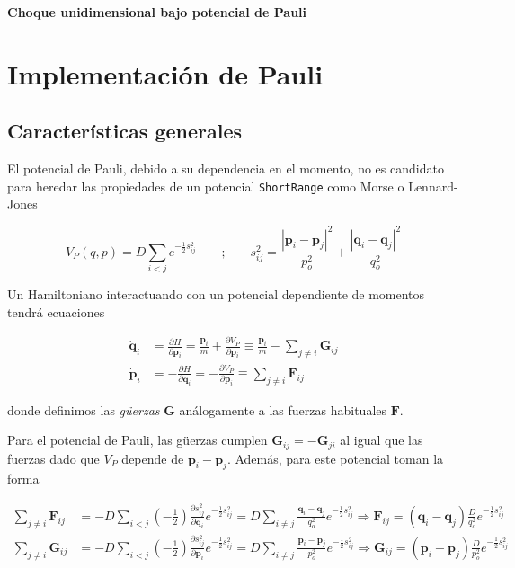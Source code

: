 \documentclass[twoside, 12pt]{article}
\providecommand{\dpart}[2]{\frac{\partial#1}{\partial#2}}
\begin{document}
\begin{center}
	{\fontsize{20pt}{10pt}\textbf{Choque unidimensional bajo potencial de Pauli}}
\end{center}

\section{Implementación de Pauli}

\subsection{Características generales}

El potencial de Pauli, debido a su dependencia en el momento, no es candidato para heredar las propiedades de un potencial \texttt{ShortRange} como Morse o Lennard-Jones

\[ V_{P}(q,p) = D\sum_{i<j} e^{-\frac{1}{2}s_{ij}^2} \qquad \text{;} \qquad s_{ij}^2 = \frac{|\mathbf{p}_i - \mathbf{p}_j|^2}{p_o^2} + \frac{|\mathbf{q}_i - \mathbf{q}_j|^2}{q_o^2}\]

Un Hamiltoniano interactuando con un potencial dependiente de momentos tendrá ecuaciones

\begin{align*}
\dot{\mathbf{q}}_i &= \dpart{H}{\mathbf{p}_i} = \frac{\mathbf{p}_i}{m} + \dpart{V_P}{\mathbf{p}_i} \equiv \frac{\mathbf{p}_i}{m} - \sum_{j\neq i} \mathbf{G}_{ij} \\
\dot{\mathbf{p}}_i &= -\dpart{H}{\mathbf{q}_i} = -\dpart{V_P}{\mathbf{p}_i} \equiv \sum_{j\neq i} \mathbf{F}_{ij}
\end{align*}

donde definimos las \textit{güerzas} $\mathbf{G}$ análogamente a las fuerzas habituales $\mathbf{F}$.

Para el potencial de Pauli, las güerzas cumplen $\mathbf{G}_{ij} = -\mathbf{G}_{ji}$ al igual que las fuerzas dado que $V_P$ depende de $\mathbf{p}_i - \mathbf{p}_j$. Además, para este potencial toman la forma

\begin{align*}
\sum_{j\neq i} \mathbf{F}_{ij} &= -D \sum_{i<j} \left(-\frac{1}{2}\right)\dpart{s_{ij}^2}{\mathbf{q}_i}e^{-\frac{1}{2}s_{ij}^2} = D \sum_{i\neq j} \frac{\mathbf{q}_i - \mathbf{q}_j}{q_o^2}e^{-\frac{1}{2}s_{ij}^2} \Longrightarrow \mathbf{F}_{ij} = (\mathbf{q}_i - \mathbf{q}_j)\frac{D}{q_o^2}e^{-\frac{1}{2}s_{ij}^2} \\
\sum_{j\neq i} \mathbf{G}_{ij} &= -D \sum_{i<j} \left(-\frac{1}{2}\right)\dpart{s_{ij}^2}{\mathbf{p}_i}e^{-\frac{1}{2}s_{ij}^2} = D \sum_{i\neq j} \frac{\mathbf{p}_i - \mathbf{p}_j}{p_o^2}e^{-\frac{1}{2}s_{ij}^2} \Longrightarrow \mathbf{G}_{ij} = (\mathbf{p}_i - \mathbf{p}_j)\frac{D}{p_o^2}e^{-\frac{1}{2}s_{ij}^2}
\end{align*}
\end{document}
